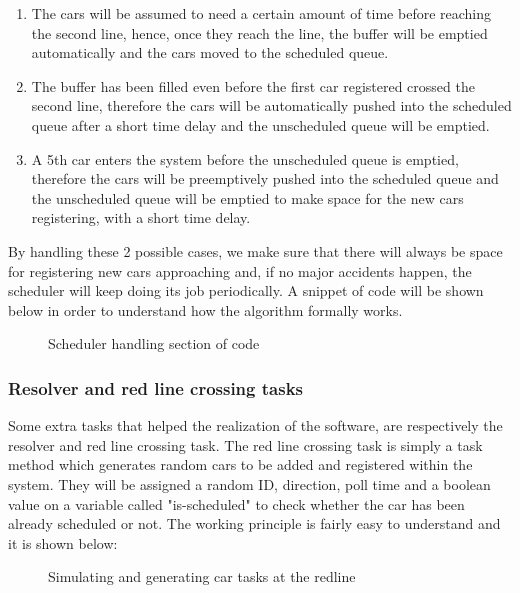 \documentclass[conference]{IEEEtran}
\begin{document}
\begin{enumerate}
\item The cars will be assumed to need a certain amount of time before reaching the second line, hence, once they reach the line, the buffer will be emptied automatically and the cars moved to the scheduled queue.

\item The buffer has been filled even before the first car registered crossed the second line, therefore the cars will be automatically pushed into the scheduled queue after a short time delay and the unscheduled queue will be emptied.

\item A 5th car enters the system before the unscheduled queue is emptied, therefore the cars will be preemptively pushed into the scheduled queue and the unscheduled queue will be emptied to make space for the new cars registering, with a short time delay.
\end{enumerate}

By handling these 2 possible cases, we make sure that there will always be space for registering new cars approaching and, if no major accidents happen, the scheduler will keep doing its job periodically.
A snippet of code will be shown below in order to understand how the algorithm formally works.
\begin{figure}[h]
    \caption{Scheduler handling section of code}
    \label{scheduler}
\end{figure}


\subsubsection{Resolver and red line crossing tasks}
Some extra tasks that helped the realization of the software, are respectively the resolver and red line crossing task. The red line crossing task is simply a task method which generates random cars to be added and registered within the system. They will be assigned a random ID, direction, poll time and a boolean value on a variable called "is-scheduled" to check whether the car has been already scheduled or not. The working principle is fairly easy to understand and it is shown below:
\begin{figure}[h]
    \caption{Simulating and generating car tasks at the redline}
    \label{redline}
\end{figure}
\end{document}
